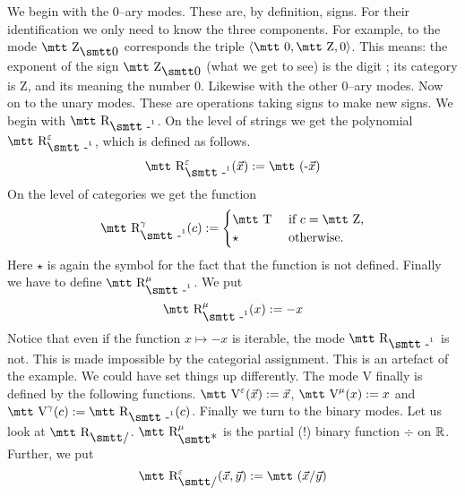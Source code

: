 We begin with the 0--ary modes. These are, by definition, signs.
For their identification we only need to know the three components.
For example, to the mode $\mbox{\mtt Z}_{\snull}$ corresponds the triple
$\auf \mbox{\mtt 0}, \mbox{\mtt Z}, 0\zu$. This means: the exponent
of the sign $\mbox{\mtt Z}_{\snull}$ (what we get to see) is the digit
{}; its category is {\mtt Z}, and its meaning the number 0.
Likewise with the other 0--ary modes. Now on to the unary modes.
These are operations taking signs to make new signs.
We begin with $\mbox{\mtt R}_{\mbox{\smtt -}^1}$. On the level of 
strings we get the polynomial 
$\mbox{\mtt R}_{\mbox{\smtt -}^1}^{\varepsilon}$,
which is defined as follows.
\begin{equation}
\mbox{\mtt R}^{\varepsilon}_{\mbox{\smtt -}^1}(\vec{x}) :=
    \mbox{\mtt (-$\vec{x}$)} 
\end{equation}
On the level of categories we get the function
\begin{equation}
\mbox{\mtt R}^{\gamma}_{\mbox{\smtt -}^1}(c) :=
    \begin{cases}
    \mbox{\mtt T} & \text{ if $c = \mbox{\mtt Z}$,} \\
    \star        & \text{ otherwise.}
    \end{cases}
\end{equation}
Here $\star$ is again the symbol for the fact that the function is
not defined. Finally we have to define 
$\mbox{\mtt R}^{\mu}_{\mbox{\smtt -}^1}$. We put
\begin{equation}
\mbox{\mtt R}^{\mu}_{\mbox{\smtt -}^1}(x) := - x 
\end{equation}
Notice that even if the function $x \mapsto -x$ is iterable,
the mode $\mbox{\mtt R}_{\mbox{\smtt -}^1}$ is not. This is made impossible
by the categorial assignment. This is an artefact of the example.
We could have set things up differently. The mode {\mtt V} finally
is defined by the following functions.
$\mbox{\mtt V}^{\varepsilon}(\vec{x}) := \vec{x}$,
$\mbox{\mtt V}^{\mu}(x) := x$ and $\mbox{\mtt V}^{\gamma}(c) :=
\mbox{\mtt R}_{\mbox{\smtt -}^1}(c)$. Finally we turn to the binary modes.
Let us look at $\mbox{\mtt R}_{\mbox{\smtt\symbol{47}}}$. 
$\mbox{\mtt R}^{\mu}_{\mbox{\smtt\symbol{42}}}$ 
is the partial (!) binary function $\div$ on $\mathbb{R}$. 
Further, we put
\begin{equation}
\mbox{\mtt R}^{\varepsilon}_{\mbox{\smtt\symbol{47}}}(\vec{x},\vec{y})
    := \mbox{\mtt ($\vec{x}$\symbol{47}$\vec{y}$)}
\end{equation}
